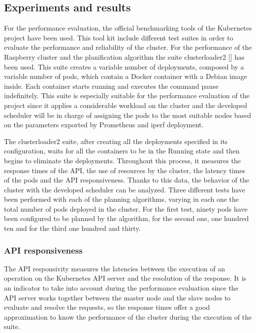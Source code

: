 \documentclass[conference]{IEEEtran}
\begin{document}
\subsection{Experiments and results}\label{sec:expe}

For the performance evaluation, the official benchmarking tools of the Kubernetes project have been used. This tool kit include different test suites in order to evaluate the performance and reliability
of the cluster. For the performance of the Raspberry cluster and the planification algorithm the suite clusterloader2 [] has been used. This suite creates a variable number of deployments, composed by
a variable number of pods, which contain a Docker container with a Debian image inside. Each container starts running and executes the command pause indefinitely. This suite is especially suitable for
the performance evaluation of the project since it applies a considerable workload on the cluster and the developed scheduler will be in charge of assigning the pods to the most suitable nodes
based on the parameters exported by Prometheus and iperf deployment.

The clusterloader2 suite, after creating all the deployments specified in its configuration, waits for all the containers to be in the Running state and then begins to eliminate the deployments.
Throughout this process, it measures the response times of the API, the use of resources by the cluster, the latency times of the pods and the API responsiveness. Thanks to this data,
the behavior of the cluster with the developed scheduler can be analyzed.
Three different tests have been performed with each of the planning algorithms, varying in each one the total number of pods deployed in the cluster. For the first test, ninety pods have been configured to be planned by the algorithm, for the second one, one hundred ten and for the third one hundred and thirty.


\subsubsection{API responsiveness}\label{sec:apiresp}
The API responsivity measures the latencies between the execution of an operation on the Kubernetes API server and the resolution of the response. It is an indicator to take into account during the 
performance evaluation since the API server works together between the master node and the slave nodes to evaluate and resolve the requests, so the response times offer a good approximation to know the 
performance of the cluster during the execution of the suite.
\end{document}
